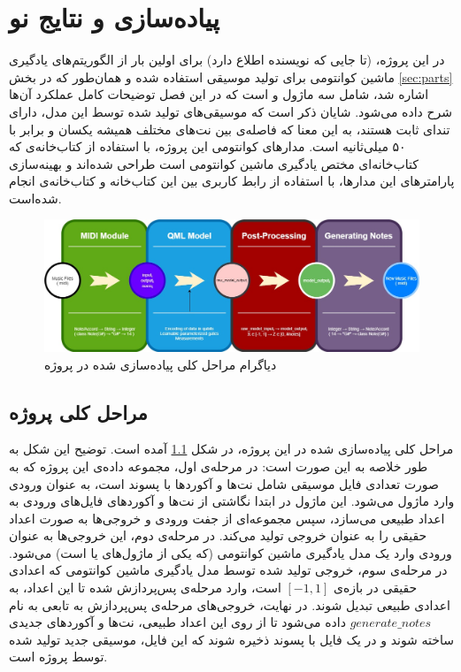 \chapter{پیاده‌سازی و نتایج نو}

در این پروژه، (تا جایی که نویسنده اطلاع دارد) برای اولین بار از الگوریتم‌های یادگیری ماشین کوانتومی برای تولید موسیقی استفاده شده و همان‌طور که در بخش
\ref{sec:parts}
اشاره شد، شامل سه ماژول 
و
است که در این فصل توضیحات کامل عملکرد آن‌ها شرح داده می‌شود.
شایان ذکر است که موسیقی‌های تولید شده توسط این مدل، دارای تندای
ثابت هستند، به این معنا که فاصله‌ی بین نت‌های مختلف همیشه یکسان و برابر با ۵۰ میلی‌ثانیه است.
مدارهای کوانتومی این پروژه، با استفاده از کتاب‌خانه‌ی 
که کتاب‌خانه‌ای مختص یادگیری ماشین کوانتومی است طراحی شده‌اند و بهینه‌سازی پارامترهای این مدارها، با استفاده از رابط کاربری بین این کتاب‌خانه و کتاب‌خانه‌ی
انجام شده‌است.

\begin{figure}
	\centering
	\includegraphics[scale=0.35]{figures/Diagram.jpg}
	\caption{دیاگرام مراحل کلی پیاده‌سازی شده در پروژه}
	\label{fig:diagram}
\end{figure}

\section{مراحل کلی پروژه}
مراحل کلی پیاده‌سازی شده در این پروژه، در شکل
\ref{fig:diagram}
آمده است.
توضیح این شکل به طور خلاصه به این صورت است: در مرحله‌ی اول، مجموعه داده‌ی این پروژه که به صورت تعدادی فایل موسیقی شامل نت‌ها و آکوردها با پسوند
است، به عنوان ورودی وارد ماژول
می‌شود. این ماژول در ابتدا نگاشتی از نت‌ها و آکوردهای فایل‌های ورودی به اعداد طبیعی می‌سازد، سپس مجموعه‌ای از جفت ورودی و خروجی‌ها به صورت اعداد حقیقی را به عنوان خروجی تولید می‌کند. در مرحله‌ی دوم، این خروجی‌ها به عنوان ورودی وارد یک مدل یادگیری ماشین کوانتومی (که یکی از ماژول‌های 
یا
است) می‌شود. در مرحله‌ی سوم، خروجی تولید شده توسط مدل یادگیری ماشین کوانتومی که اعدادی حقیقی در بازه‌ی
$[-1, 1]$
است، وارد مرحله‌ی پس‌پردازش شده تا این اعداد، به اعدادی طبیعی تبدیل شوند.
در نهایت، خروجی‌های مرحله‌ی پس‌پردازش به تابعی به نام
$generate\_notes$
داده می‌شود تا از روی این اعداد طبیعی، نت‌ها و آکوردهای جدیدی ساخته شوند و در یک فایل با پسوند
ذخیره شوند که این فایل، موسیقی جدید تولید شده توسط پروژه است.



